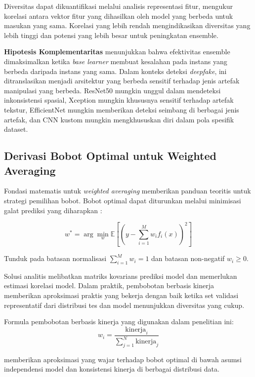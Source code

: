 Diversitas dapat dikuantifikasi melalui analisis representasi fitur, mengukur korelasi antara vektor fitur yang dihasilkan oleh model yang berbeda untuk masukan yang sama. Korelasi yang lebih rendah mengindikasikan diversitas yang lebih tinggi dan potensi yang lebih besar untuk peningkatan ensemble.

\textbf{Hipotesis Komplementaritas} menunjukkan bahwa efektivitas ensemble dimaksimalkan ketika \textit{base learner} membuat kesalahan pada instans yang berbeda daripada instans yang sama. Dalam konteks deteksi \textit{deepfake}, ini ditranslasikan menjadi arsitektur yang berbeda sensitif terhadap jenis artefak manipulasi yang berbeda. ResNet50 mungkin unggul dalam mendeteksi inkonsistensi spasial, Xception mungkin khususnya sensitif terhadap artefak tekstur, EfficientNet mungkin memberikan deteksi seimbang di berbagai jenis artefak, dan CNN kustom mungkin mengkhususkan diri dalam pola spesifik dataset.

\subsection{Derivasi Bobot Optimal untuk Weighted Averaging}

Fondasi matematis untuk \textit{weighted averaging} memberikan panduan teoritis untuk strategi pemilihan bobot. Bobot optimal dapat diturunkan melalui minimisasi galat prediksi yang diharapkan \cite{hashem1997optimal}:

\begin{equation}
w^* = \arg\min_w \mathbb{E}[(y - \sum_{i=1}^M w_i f_i(x))^2]
\label{eq:optimal_weights}
\end{equation}

Tunduk pada batasan normalisasi $\sum_{i=1}^M w_i = 1$ dan batasan non-negatif $w_i \geq 0$.

Solusi analitis melibatkan matriks kovarians prediksi model dan memerlukan estimasi korelasi model. Dalam praktik, pembobotan berbasis kinerja memberikan aproksimasi praktis yang bekerja dengan baik ketika set validasi representatif dari distribusi tes dan model menunjukkan diversitas yang cukup.

Formula pembobotan berbasis kinerja yang digunakan dalam penelitian ini:
\begin{equation}
w_i = \frac{\text{kinerja}_i}{\sum_{j=1}^{N} \text{kinerja}_j}
\label{eq:performance_weight}
\end{equation}

memberikan aproksimasi yang wajar terhadap bobot optimal di bawah asumsi independensi model dan konsistensi kinerja di berbagai distribusi data.

